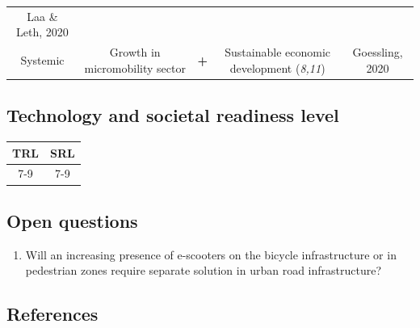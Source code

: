 \documentclass[
]{book}
\providecommand{\tightlist}{%
  \setlength{\itemsep}{0pt}\setlength{\parskip}{0pt}}
\begin{document}
\begin{longtable}[]{@{}ccccc@{}}
\begin{minipage}[t]{0.17\columnwidth}
Laa \& Leth, 2020\strut
\end{minipage}\tabularnewline
\begin{minipage}[t]{0.17\columnwidth}\centering
Systemic\strut
\end{minipage} & \begin{minipage}[t]{0.16\columnwidth}\centering
Growth in micromobility sector\strut
\end{minipage} & \begin{minipage}[t]{0.17\columnwidth}\centering
\textbf{+}\strut
\end{minipage} & \begin{minipage}[t]{0.17\columnwidth}\centering
Sustainable economic development (\emph{8,11})\strut
\end{minipage} & \begin{minipage}[t]{0.17\columnwidth}\centering
Goessling, 2020\strut
\end{minipage}\tabularnewline
\bottomrule
\end{longtable}

\hypertarget{technology-and-societal-readiness-level-33}{%
\subsection*{Technology and societal readiness level}\label{technology-and-societal-readiness-level-33}}

\begin{longtable}[]{@{}cc@{}}
\toprule
TRL & SRL\tabularnewline
\midrule
\endhead
7-9 & 7-9\tabularnewline
\bottomrule
\end{longtable}

\hypertarget{open-questions-33}{%
\subsection*{Open questions}\label{open-questions-33}}

\begin{enumerate}
\def\labelenumi{\arabic{enumi}.}
\tightlist
\item
  Will an increasing presence of e-scooters on the bicycle infrastructure or in pedestrian zones require separate solution in urban road infrastructure?
\end{enumerate}

\hypertarget{references-33}{%
\subsection*{References}\label{references-33}}
\end{document}
